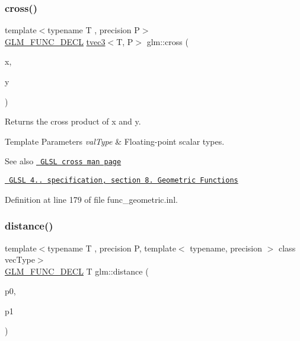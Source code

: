 \subsubsection{\texorpdfstring{cross()}{cross()}}
{\footnotesize\ttfamily template$<$typename T , precision P$>$ \\
\mbox{\hyperlink{setup_8hpp_ab2d052de21a70539923e9bcbf6e83a51}{G\+L\+M\+\_\+\+F\+U\+N\+C\+\_\+\+D\+E\+CL}} \mbox{\hyperlink{structglm_1_1tvec3}{tvec3}}$<$T, P$>$ glm\+::cross (\begin{DoxyParamCaption}\item[{\mbox{\hyperlink{structglm_1_1tvec3}{tvec3}}$<$ T, P $>$ const \&}]{x,  }\item[{\mbox{\hyperlink{structglm_1_1tvec3}{tvec3}}$<$ T, P $>$ const \&}]{y }\end{DoxyParamCaption})}

Returns the cross product of x and y.


\begin{DoxyTemplParams}{Template Parameters}
{\em val\+Type} & Floating-\/point scalar types.\\
\hline
\end{DoxyTemplParams}
\begin{DoxySeeAlso}{See also}
\href{http://www.opengl.org/sdk/docs/manglsl/xhtml/cross.xml}{\texttt{ G\+L\+SL cross man page}} 

\href{http://www.opengl.org/registry/doc/GLSLangSpec.4.20.8.pdf}{\texttt{ G\+L\+SL 4.. specification, section 8. Geometric Functions}} 
\end{DoxySeeAlso}


Definition at line 179 of file func\+\_\+geometric.\+inl.

\mbox{\label{group__core__func__geometric_ga7ca317dde0d7e94d920153554d4a02a8}} 
\subsubsection{\texorpdfstring{distance()}{distance()}}
{\footnotesize\ttfamily template$<$typename T , precision P, template$<$ typename, precision $>$ class vec\+Type$>$ \\
\mbox{\hyperlink{setup_8hpp_ab2d052de21a70539923e9bcbf6e83a51}{G\+L\+M\+\_\+\+F\+U\+N\+C\+\_\+\+D\+E\+CL}} T glm\+::distance (\begin{DoxyParamCaption}\item[{vec\+Type$<$ T, P $>$ const \&}]{p0,  }\item[{vec\+Type$<$ T, P $>$ const \&}]{p1 }\end{DoxyParamCaption})}

